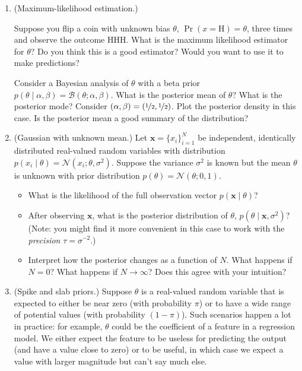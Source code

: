 \documentclass{article}
\newcommand{\given}{\mid}
\newcommand{\mc}[1]{\mathcal{#1}}
\begin{document}
\begin{enumerate}
\item
  (Maximum-likelihood estimation.)

  Suppose you flip a coin with unknown bias $\theta$, $\Pr(x =
  \text{H}) = \theta$, three times and observe the outcome HHH.  What
  is the maximum likelihood estimator for $\theta$?  Do you think this
  is a good estimator?  Would you want to use it to make predictions?

  Consider a Bayesian analysis of $\theta$ with a beta prior $p(\theta
  \given \alpha, \beta) = \mc{B}(\theta; \alpha, \beta)$.  What is the
  posterior mean of $\theta$?  What is the posterior mode?  Consider
  $(\alpha, \beta) = (\nicefrac{1}{2}, \nicefrac{1}{2})$.  Plot the
  posterior density in this case.  Is the posterior mean a good
  summary of the distribution?

\item
  (Gaussian with unknown mean.)
  Let $\bm{x} = \{ x_i \}_{i = 1}^N$ be independent, identically
  distributed real-valued random variables with distribution $p(x_i
  \given \theta) = \mc{N}(x_i; \theta, \sigma^2)$.  Suppose the
  variance $\sigma^2$ is known but the mean $\theta$ is unknown with
  prior distribution $p(\theta) = \mc{N}(\theta; 0, 1)$.
  \begin{itemize}
  \item
    What is the likelihood of the full observation vector $p(\bm{x}
    \given \theta)$?
  \item
    After observing $\bm{x}$, what is the posterior distribution of
    $\theta$, $p(\theta \given \bm{x}, \sigma^2)$?  (Note: you might
    find it more convenient in this case to work with the
    \emph{precision} $\tau = \sigma^{-2}$.)
  \item
    Interpret how the posterior changes as a function of $N$.  What
    happens if $N = 0$?  What happens if $N \to \infty$?  Does this
    agree with your intuition?
  \end{itemize}

\item
  (Spike and slab priors.)
  Suppose $\theta$ is a real-valued random variable that is expected
  to either be near zero (with probability $\pi$) or to have a wide
  range of potential values (with probability $(1 - \pi)$).  Such
  scenarios happen a lot in practice: for example, $\theta$ could be
  the coefficient of a feature in a regression model.  We either
  expect the feature to be useless for predicting the output (and have
  a value close to zero) or to be useful, in which case we expect a
  value with larger magnitude but can't say much else.


\end{enumerate}
\end{document}

